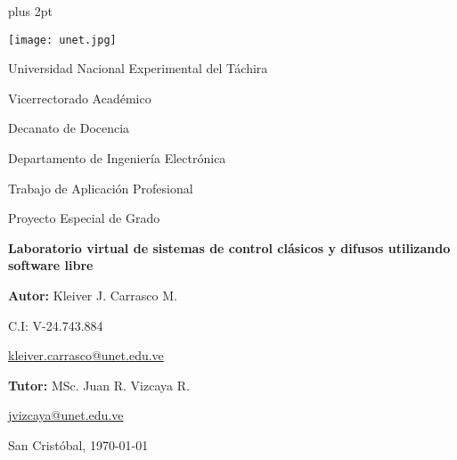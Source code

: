 \begin{titlepage}
\parskip=7.25pt plus 2pt
\begin{center}
	\texttt{[image: unet.jpg]}
	
	Universidad Nacional Experimental del Táchira 
	
	Vicerrectorado Académico
	
	Decanato de Docencia
	
	Departamento de Ingeniería Electrónica
	
	Trabajo de Aplicación Profesional
	
	Proyecto Especial de Grado
\end{center}

\centering
	\vspace{2.5cm}
	\vfill
	{\Large \textbf{Laboratorio virtual de sistemas de control clásicos y difusos utilizando software libre}\par}

\vfill
\begin{flushright}
	\begin{spacing}{1.5}
		\textbf{Autor:} Kleiver J. Carrasco M.
		
		C.I: V-24.743.884
		
		\href{kleiver.carrasco@unet.edu.ve}{kleiver.carrasco@unet.edu.ve}
		
		\textbf{Tutor:} MSc. Juan R. Vizcaya R.
		
		\href{jvizcaya@unet.edu.ve}{jvizcaya@unet.edu.ve}
	\end{spacing}	
\end{flushright}

\vfill
	San Cristóbal, \monthyeardate\today
\leavevmode
\end{titlepage}